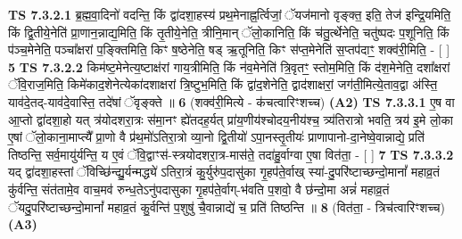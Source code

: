 \documentclass[17pt]{extarticle}
\begin{document}
                                        \textbf{ TS 7.3.2.1} \newline
                  ब्र॒ह्म॒वा॒दिनो॑ वदन्ति॒ किं द्वा॑दशा॒हस्य॑ प्रथ॒मेनाह्न॒र्त्विजां॒ ॅयज॑मानो वृङ्क्त॒ इति॒ तेज॑ इन्द्रि॒यमिति॒ किं द्वि॒तीये॒नेति॑ प्रा॒णान॒न्नाद्य॒मिति॒ किं तृ॒तीये॒नेति॒ त्रीनि॒मान् ॅलो॒कानिति॒ किं च॑तु॒र्त्थेनेति॒ चतु॑ष्पदः प॒शूनिति॒ किं प॑ञ्च॒मेनेति॒ पञ्चा᳚क्षरां प॒ङ्क्तिमिति॒ किꣳ ष॒ष्ठेनेति॒ षड् ऋ॒तूनिति॒ किꣳ स॑प्त॒मेनेति॑ स॒प्तप॑दाꣳ॒॒ शक्व॑री॒मिति॒ - [  ] \textbf{  5} \newline
                  \newline
                                \textbf{ TS 7.3.2.2} \newline
                  किम॑ष्ट॒मेनेत्य॒ष्टाक्ष॑रां गाय॒त्रीमिति॒ किं न॑व॒मेनेति॑ त्रि॒वृतꣳ॒॒ स्तोम॒मिति॒ किं द॑श॒मेनेति॒ दशा᳚क्षरां ॅवि॒राज॒मिति॒ किमे॑काद॒शेनेत्येका॑दशाक्षरां त्रि॒ष्टुभ॒मिति॒ किं द्वा॑द॒शेनेति॒ द्वाद॑शाक्षरां॒ जग॑ती॒मित्ये॒ताव॒द्वा अ॑स्ति॒ याव॑दे॒तद्-याव॑दे॒वास्ति॒ तदे॑षां ॅवृङ्क्ते ॥ \textbf{  6} \newline
                  \newline
                      (शक्व॑री॒मित्ये - क॑चत्वारिꣳशच्च)  \textbf{(A2)} \newline \newline
                                        \textbf{ TS 7.3.3.1} \newline
                  ए॒ष वा आ॒प्तो द्वा॑दशा॒हो यत् त्र॑योदशरा॒त्रः स॑मा॒नꣳ ह्ये॑तदह॒र्यत् प्रा॑य॒णीय॑श्चोदय॒नीय॑श्च॒ त्र्य॑तिरात्रो भवति॒ त्रय॑ इ॒मे लो॒का ए॒षां ॅलो॒काना॒माप्त्यै᳚ प्रा॒णो वै प्र॑थ॒मो॑ऽतिरा॒त्रो व्या॒नो द्वि॒तीयो॑ ऽपा॒नस्तृ॒तीयः॑ प्राणापानो-दा॒नेष्वे॒वान्नाद्ये॒ प्रति॑ तिष्ठन्ति॒ सर्व॒मायु॑र्यन्ति॒ य ए॒वं ॅवि॒द्वाꣳस॑-स्त्रयोदशरा॒त्र-मास॑ते॒ तदा॑हु॒र्वाग्वा ए॒षा वित॑ता॒ - [  ] \textbf{  7} \newline
                  \newline
                                \textbf{ TS 7.3.3.2} \newline
                  यद् द्वा॑दशा॒हस्तां ॅविच्छि॑न्द्यु॒र्यन्मद्ध्ये॑ ऽतिरा॒त्रं कु॒र्युरु॑प॒दासु॑का गृ॒हप॑ते॒र्वाख् स्या॑-दु॒परि॑ष्टाच्छन्दो॒मानां᳚ महाव्र॒तं कु॑र्वन्ति॒ संत॑तामे॒व वाच॒मव॑ रुन्ध॒तेऽनु॑पदासुका गृ॒हप॑ते॒र्वाग्-भ॑वति प॒शवो॒ वै छ॑न्दो॒मा अन्नं॑ महाव्र॒तं ॅयदु॒परि॑ष्टाच्छन्दो॒मानां᳚ महाव्र॒तं कु॒र्वन्ति॑ प॒शुषु॑ चै॒वान्नाद्ये॑ च॒ प्रति॑ तिष्ठन्ति ॥ \textbf{  8 } \newline
                  \newline
                      (वित॑ता॒ - त्रिच॑त्वारिꣳशच्च)  \textbf{(A3)} \newline \newline
\end{document}
